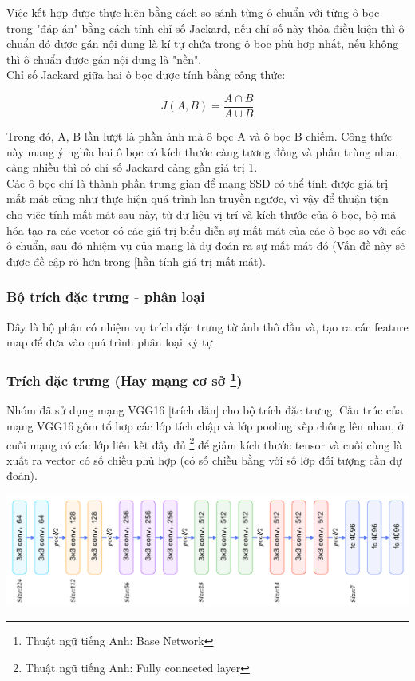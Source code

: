 \documentclass[a4paper,12pt]{article}
\begin{document}
	Việc kết hợp được thực hiện bằng cách so sánh từng ô chuẩn với từng ô bọc trong "đáp án" bằng cách tính chỉ số Jackard, nếu chỉ số này thỏa điều kiện thì ô chuẩn đó được gán nội dung là kí tự chứa trong ô bọc phù hợp nhất, nếu không thì ô chuẩn được gán nội dung là "nền".\\
	
	Chỉ số Jackard giữa hai ô bọc được tính bằng công thức:
	
	$$  J(A, B) = \frac{A \cap B }{ A \cup B } $$
	
	Trong đó, A, B lần lượt là phần ảnh mà ô bọc A và ô bọc B chiếm. Công thức này mang ý nghĩa hai ô bọc có kích thước càng tương đồng và phần trùng nhau càng nhiều thì có chỉ số Jackard càng gần giá trị 1.\\
	
	Các ô bọc chỉ là thành phần trung gian để mạng SSD có thể tính được giá trị mất mát cũng như thực hiện quá trình lan truyền ngược, vì vậy để thuận tiện cho việc tính mất mát sau này, từ dữ liệu vị trí và kích thước của ô bọc, bộ mã hóa tạo ra các vector có các giá trị biểu diễn sự mất mát của các ô bọc so với các ô chuẩn, sau đó nhiệm vụ của mạng là dự đoán ra sự mất mát đó (Vấn đề này sẽ được đề cập rõ hơn trong [hần tính giá trị mất mát).
	
	\subsubsection{Bộ trích đặc trưng - phân loại}
	Đây là bộ phận có nhiệm vụ trích đặc trưng từ ảnh thô đầu và, tạo ra các feature map để đưa vào quá trình phân loại ký tự
	
	\subsubsection*{Trích đặc trưng (Hay mạng cơ sở \footnote{Thuật ngữ tiếng Anh: Base Network})}
	
	Nhóm đã sử dụng mạng VGG16 [trích dẫn] cho bộ trích đặc trưng. Cấu trúc của mạng VGG16 gồm tổ hợp các lớp tích chập và lớp pooling xếp chồng lên nhau, ở cuối mạng có các lớp liên kết đầy đủ \footnote{Thuật ngữ tiếng Anh: Fully connected layer} để giảm kích thước tensor và cuối cùng là xuất ra vector có số chiều phù hợp (có số chiều bằng với số lớp đối tượng cần dự đoán).
	
	\begin{center}
		
		\centering
		\includegraphics[width=0.8\linewidth]{vgg16.png}
		\vspace{0.5cm}
	\end{center}
	
\end{document}
